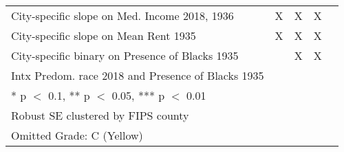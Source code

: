 \begin{table}
{\begin{tabular}[t]{lccc>{}c}
City-specific slope on Med. Income 2018, 1936 & X & X & X & \cellcolor{green}{\textcolor{white}{X}}\\
City-specific slope on Mean Rent 1935 & X & X & X & \cellcolor{green}{\textcolor{white}{X}}\\
City-specific binary on Presence of Blacks 1935 &  & X & X & \cellcolor{green}{\textcolor{white}{X}}\\
Intx Predom. race 2018 and Presence of Blacks 1935 &  &  &  & \cellcolor{green}{\textcolor{white}{X}}\\
\bottomrule
\multicolumn{5}{l}{\textsuperscript{} * p $<$ 0.1, ** p $<$ 0.05, *** p $<$ 0.01}\\
\multicolumn{5}{l}{\textsuperscript{} Robust SE clustered by FIPS county}\\
\multicolumn{5}{l}{\textsuperscript{} Omitted Grade: C (Yellow)}\\
\end{tabular}}
\end{table}
